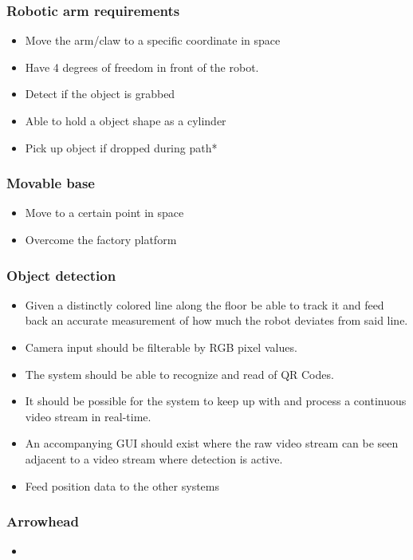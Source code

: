 \documentclass{beamer}
\begin{document}
\begin{frame}
    \frametitle{Robotic arm requirements}
    \begin{itemize}
        \item Move the arm/claw to a specific coordinate in space
        \item Have 4 degrees of freedom in front of the robot.
        \item Detect if the object is grabbed
        \item Able to hold a object shape as a cylinder
        \item Pick up object if dropped during path*
    \end{itemize}
\end{frame}

\begin{frame}
    \frametitle{Movable base}
    \begin{itemize}
        \item Move to a certain point in space
        \item Overcome the factory platform
    \end{itemize}
\end{frame}

\begin{frame}
    \frametitle{Object detection}
    \begin{itemize}
        \item Given a distinctly colored line along the floor be able to track it and
        feed back an accurate measurement of how much the robot deviates from said line.
        \item Camera input should be filterable by RGB pixel values.
        \item The system should be able to recognize and read of QR Codes.
        \item It should be possible for the system to keep up with and process a continuous video stream in real-time.
        \item An accompanying GUI should exist where the raw video stream can be seen adjacent to a video stream where detection is active.
        \item Feed position data to the other systems
    \end{itemize}
\end{frame}

\begin{frame}
    \frametitle{Arrowhead}
    \begin{itemize}
        \item 
    \end{itemize}
\end{frame}
\end{document}
